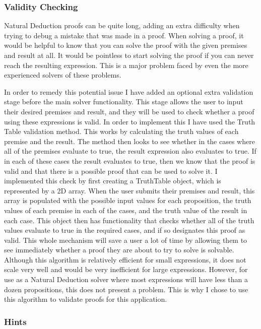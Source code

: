 \subsubsection{Validity Checking \label{validity}}
Natural Deduction proofs can be quite long, adding an extra difficulty when trying to debug a mistake that was made in a proof. When solving a proof, it would be helpful to know that you can solve the proof with the given premises and result at all. It would be pointless to start solving the proof if you can never reach the resulting expression. This is a major problem faced by even the more experienced solvers of these problems.

In order to remedy this potential issue I have added an optional extra validation stage before the main solver functionality. This stage allows the user to input their desired premises and result, and they will be used to check whether a proof using these expressions is valid. In order to implement this I have used the Truth Table validation method. This works by calculating the truth values of each premise and the result. The method then looks to see whether in the cases where all of the premises evaluate to true, the result expression also evaluates to true. If in each of these cases the result evaluates to true, then we know that the proof is valid and that there is a possible proof that can be used to solve it. I implemented this check by first creating a TruthTable object, which is represented by a 2D array. When the user submits their premises and result, this array is populated with the possible input values for each proposition, the truth values of each premise in each of the cases, and the truth value of the result in each case. This object then has functionality that checks whether all of the truth values evaluate to true in the required cases, and if so designates this proof as valid. This whole mechanism will save a user a lot of time by allowing them to see immediately whether a proof they are about to try to solve is solvable. Although this algorithm is relatively efficient for small expressions, it does not scale very well and would be very inefficient for large expressions. However, for use as a Natural Deduction solver where most expressions will have less than a dozen propositions, this does not present a problem. This is why I chose to use this algorithm to validate proofs for this application. 

\subsubsection{Hints \label{hints}}

